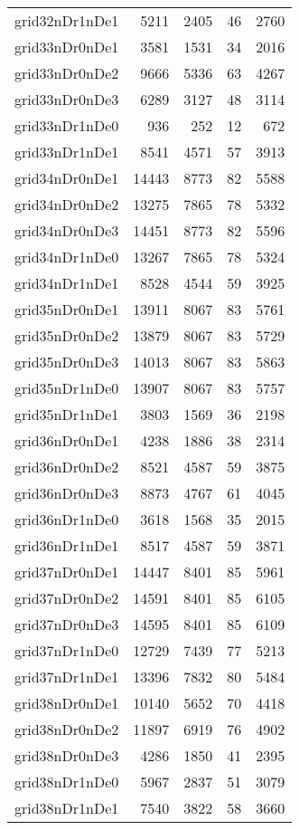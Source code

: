 \begin{longtable}{lrrrr}
grid32nDr1nDe1 & 5211 & 2405 & 46 & 2760 \\
grid33nDr0nDe1 & 3581 & 1531 & 34 & 2016 \\
grid33nDr0nDe2 & 9666 & 5336 & 63 & 4267 \\
grid33nDr0nDe3 & 6289 & 3127 & 48 & 3114 \\
grid33nDr1nDe0 & 936 & 252 & 12 & 672 \\
grid33nDr1nDe1 & 8541 & 4571 & 57 & 3913 \\
grid34nDr0nDe1 & 14443 & 8773 & 82 & 5588 \\
grid34nDr0nDe2 & 13275 & 7865 & 78 & 5332 \\
grid34nDr0nDe3 & 14451 & 8773 & 82 & 5596 \\
grid34nDr1nDe0 & 13267 & 7865 & 78 & 5324 \\
grid34nDr1nDe1 & 8528 & 4544 & 59 & 3925 \\
grid35nDr0nDe1 & 13911 & 8067 & 83 & 5761 \\
grid35nDr0nDe2 & 13879 & 8067 & 83 & 5729 \\
grid35nDr0nDe3 & 14013 & 8067 & 83 & 5863 \\
grid35nDr1nDe0 & 13907 & 8067 & 83 & 5757 \\
grid35nDr1nDe1 & 3803 & 1569 & 36 & 2198 \\
grid36nDr0nDe1 & 4238 & 1886 & 38 & 2314 \\
grid36nDr0nDe2 & 8521 & 4587 & 59 & 3875 \\
grid36nDr0nDe3 & 8873 & 4767 & 61 & 4045 \\
grid36nDr1nDe0 & 3618 & 1568 & 35 & 2015 \\
grid36nDr1nDe1 & 8517 & 4587 & 59 & 3871 \\
grid37nDr0nDe1 & 14447 & 8401 & 85 & 5961 \\
grid37nDr0nDe2 & 14591 & 8401 & 85 & 6105 \\
grid37nDr0nDe3 & 14595 & 8401 & 85 & 6109 \\
grid37nDr1nDe0 & 12729 & 7439 & 77 & 5213 \\
grid37nDr1nDe1 & 13396 & 7832 & 80 & 5484 \\
grid38nDr0nDe1 & 10140 & 5652 & 70 & 4418 \\
grid38nDr0nDe2 & 11897 & 6919 & 76 & 4902 \\
grid38nDr0nDe3 & 4286 & 1850 & 41 & 2395 \\
grid38nDr1nDe0 & 5967 & 2837 & 51 & 3079 \\
grid38nDr1nDe1 & 7540 & 3822 & 58 & 3660 \\

\end{longtable}
